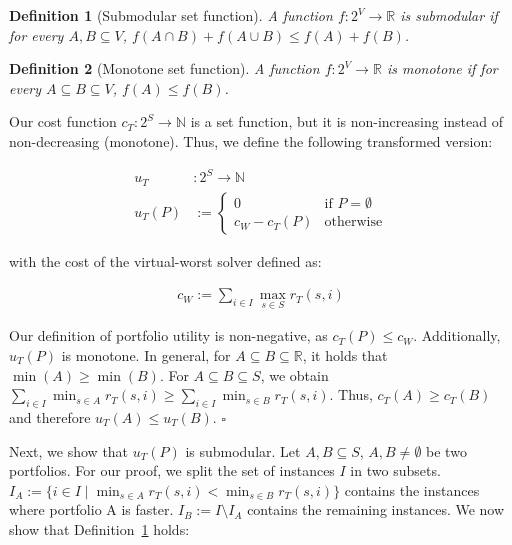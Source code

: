 \documentclass[conference]{IEEEtran}
\newtheorem{definition}{Definition}
\begin{document}
\begin{definition}[Submodular set function]
	A function $f : 2^V \rightarrow \mathbb{R}$ is submodular if for every $A, B \subseteq V$, $f(A \cap B) + f(A \cup B) \leq f(A) + f(B)$.
	\label{def:submodular}
\end{definition}

\begin{definition}[Monotone set function]
	A function $f : 2^V \rightarrow \mathbb{R}$ is monotone if for every $A \subseteq B \subseteq V$, $f(A) \leq f(B)$.
	\label{sef:monotone}
\end{definition}

Our cost function $c_{T}: 2^S \rightarrow \mathbb{N}$ is a set function, but it is non-increasing instead of non-decreasing (monotone).
Thus, we define the following transformed version:

\begin{align*}
	u_{T} &: 2^S \rightarrow \mathbb{N}\\
	u_{T}(P) &:= \begin{cases}
		0 & \text{if }P=\emptyset\\
		c_W - c_{T}(P) & \text{otherwise}
	\end{cases} \tag*{Portfolio Utility}
\end{align*}

with the cost of the virtual-worst solver defined as:

\begin{align*}
	c_W := \sum_{i \in I}{\max_{s \in S}{r_T(s,i)}} \tag*{Virtual Worst Solver}
\end{align*}

Our definition of portfolio utility is non-negative, as $c_{T}(P) \leq c_W$.
Additionally, $u_{T}(P)$ is monotone.
In general, for $A \subseteq B \subseteq \mathbb{R}$, it holds that $\min(A) \geq \min(B)$.
For $A \subseteq B \subseteq S$, we obtain $\sum_{i \in I}{\min_{s \in A}{r_T(s,i)}} \geq \sum_{i \in I}{\min_{s \in B}{r_T(s,i)}}$.
Thus, $c_{T}(A) \geq c_{T}(B)$ and therefore $u_{T}(A) \leq u_{T}(B)$. \hfill$\square$

Next, we show that $u_{T}(P)$ is submodular.
Let $A,B \subseteq S$, $A,B \neq \emptyset$ be two portfolios.
For our proof, we split the set of instances $I$ in two subsets.
$I_A := \{i \in I \mid \min_{s \in A}{r_T(s,i)} < \min_{s \in B}{r_T(s,i)} \}$ contains the instances where portfolio A is faster.
$I_B := I \setminus I_A$ contains the remaining instances.
We now show that Definition~\ref{def:submodular} holds:
\end{document}
